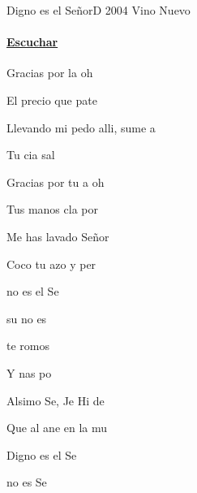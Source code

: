 \documentclass[12pt, spanish]{book}
\newcommand{\NotCCLIed}{\relax}
\begin{document}
    \begin{song}{Digno es el Señor}{D}
        {2004} %
        {Vino Nuevo}
        {} %
        {} %
        \ifChordBk
            \paragraph{\mbox{}\hfill\protect\href{https://open.spotify.com/intl-es/track/4EMkguiX21WoRl0nsMHYvC}{Escuchar}\mbox{}\hfill}
        \fi

        \begin{SBOpGroup}
            Gracias por la  oh 

            El precio que pate  

            Llevando mi pedo alli, sume a

            Tu cia  sal
        \end{SBOpGroup}
        \vskip 20pt
        \begin{SBOpGroup}
            Gracias por tu a oh 

            Tus manos cla por 

            Me has lavado  Señor

            Coco  tu azo y  per
        \end{SBOpGroup}

        \begin{SBChorus}
            no es el Se

             su no es

             te romos 

            Y nas  po

            Alsimo Se, Je Hi de 

            Que al ane en la  mu

            Digno es el Se

            no es  Se
        \end{SBChorus}


\end{song}
\end{document}
